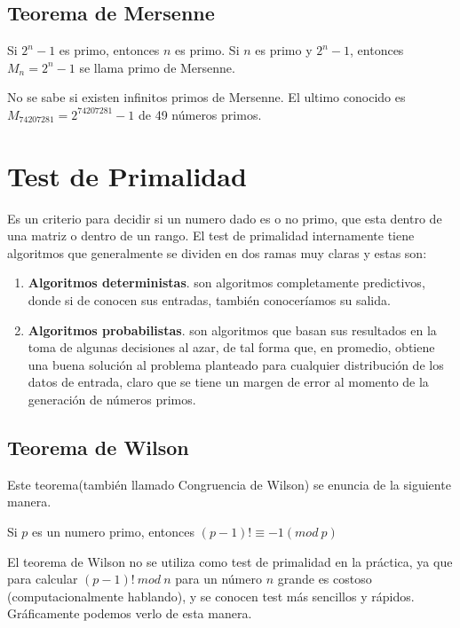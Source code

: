\documentclass[11pt, conference]{IEEEtran}
\begin{document}
\subsection{Teorema de Mersenne}
Si $2^{n}-1$ es primo, entonces $n$ es primo. Si $n$	es primo y $2^{n}-1$, entonces $M_{n}=2^{n}-1$ se llama primo de Mersenne.

No se sabe si existen infinitos primos de Mersenne. El ultimo conocido es $M_{74 207 281}=2^{74 207 281}-1$ de 49 números primos.

\section{Test de Primalidad}
Es un criterio para decidir si un numero dado es o no primo, que esta dentro de una matriz o dentro de un rango. El test de primalidad internamente tiene algoritmos que generalmente se dividen en dos ramas muy claras y estas son:

\begin{enumerate}
	\item \textbf{Algoritmos deterministas}. son algoritmos completamente predictivos, donde si de conocen sus entradas, también conoceríamos su salida.
	\item \textbf{Algoritmos probabilistas}. son algoritmos que basan sus resultados en la toma de algunas decisiones al azar, de tal forma que, en promedio, obtiene una buena solución al problema planteado para cualquier distribución de los datos de entrada, claro que se tiene un margen de error al momento de la generación de números primos.
\end{enumerate}

\subsection{Teorema de Wilson}
Este teorema(también llamado Congruencia de Wilson) se enuncia de la siguiente manera.\cite{b}

\begin{center}
	Si $p$ es un numero primo, entonces $(p-1)!\equiv-1(mod\ p)$
\end{center} 

El teorema de Wilson no se utiliza como test de primalidad en la práctica, ya que para calcular $(p-1)!\ mod\ n$ para un número $n$ grande es costoso (computacionalmente hablando), y se conocen test más sencillos y rápidos. Gráficamente podemos verlo de esta manera.
\end{document}

